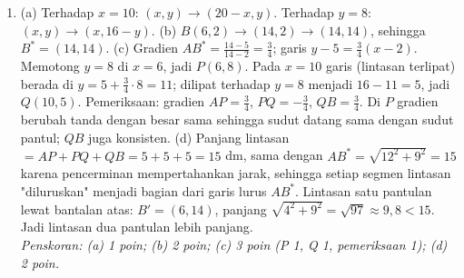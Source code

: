 \documentclass[a4paper,11pt]{article}
\begin{document}
\begin{enumerate}[leftmargin=2em,itemsep=3pt,topsep=2pt]
\item[\textbf{5.}] (a) Terhadap $x=10$: $(x,y)\to(20-x,y)$. Terhadap $y=8$: $(x,y)\to(x,16-y)$. (b) $B(6,2)\to(14,2)\to(14,14)$, sehingga $B^{*}=(14,14)$. (c) Gradien $AB^{*}=\frac{14-5}{14-2}=\frac34$; garis $y-5=\frac34(x-2)$. Memotong $y=8$ di $x=6$, jadi $P(6,8)$. Pada $x=10$ garis (lintasan terlipat) berada di $y=5+\frac34\cdot8=11$; dilipat terhadap $y=8$ menjadi $16-11=5$, jadi $Q(10,5)$. Pemeriksaan: gradien $AP=\frac34$, $PQ=-\frac34$, $QB=\frac34$. Di $P$ gradien berubah tanda dengan besar sama sehingga sudut datang sama dengan sudut pantul; $QB$ juga konsisten. (d) Panjang lintasan $=AP+PQ+QB=5+5+5=15$ dm, sama dengan $AB^{*}=\sqrt{12^2+9^2}=15$ karena pencerminan mempertahankan jarak, sehingga setiap segmen lintasan "diluruskan" menjadi bagian dari garis lurus $AB^{*}$. Lintasan satu pantulan lewat bantalan atas: $B'=(6,14)$, panjang $\sqrt{4^2+9^2}=\sqrt{97}\approx9{,}8<15$. Jadi lintasan dua pantulan lebih panjang. \\ \textit{Penskoran: (a) 1 poin; (b) 2 poin; (c) 3 poin (P 1, Q 1, pemeriksaan 1); (d) 2 poin.}
\end{enumerate}
\end{document}
